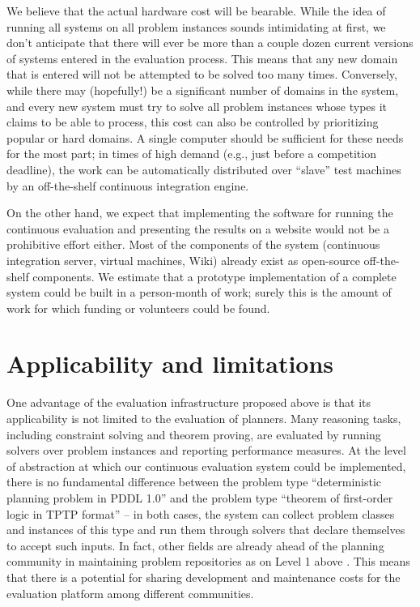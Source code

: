 We believe that the actual hardware cost will be bearable.  While the
idea of running all systems on all problem instances sounds
intimidating at first, we don't anticipate that there will ever be
more than a couple dozen current versions of systems entered in the
evaluation process.  This means that any new domain that is entered
will not be attempted to be solved too many times.  Conversely, while
there may (hopefully!) be a significant number of domains in the
system, and every new system must try to solve all problem instances
whose types it claims to be able to process, this cost can also be
controlled by prioritizing popular or hard domains.  A single computer
should be sufficient for these needs for the most part; in times of
high demand (e.g., just before a competition deadline), the work can
be automatically distributed over ``slave'' test machines by an
off-the-shelf continuous integration engine.

On the other hand, we expect that implementing the software for
running the continuous evaluation and presenting the results on a
website would not be a prohibitive effort either.  Most of the
components of the system (continuous integration server, virtual
machines, Wiki) already exist as open-source off-the-shelf
components.  We estimate that a prototype implementation of a complete
system could be built in a person-month of work; surely this is the
amount of work for which funding or volunteers could be found.






\section{Applicability and limitations}

One advantage of the evaluation infrastructure proposed above is that
its applicability is not limited to the evaluation of planners.
Many reasoning tasks, including constraint solving and theorem
proving, are evaluated by running solvers over problem instances
and reporting performance measures.  At the level of abstraction at
which our continuous evaluation system could be implemented, there is
no fundamental difference between the problem type ``deterministic
planning problem in PDDL 1.0'' and the problem type ``theorem of
first-order logic in TPTP format'' -- in both cases, the system can
collect problem classes and instances of this type and run them
through solvers that declare themselves to accept such inputs.  In
fact, other fields are already ahead of the planning community in
maintaining problem repositories as on Level 1 above
\cite{SS98,csplib,Asuncion+Newman:2007}. This means that there is a
potential for sharing development and maintenance costs for the
evaluation platform among different communities.

